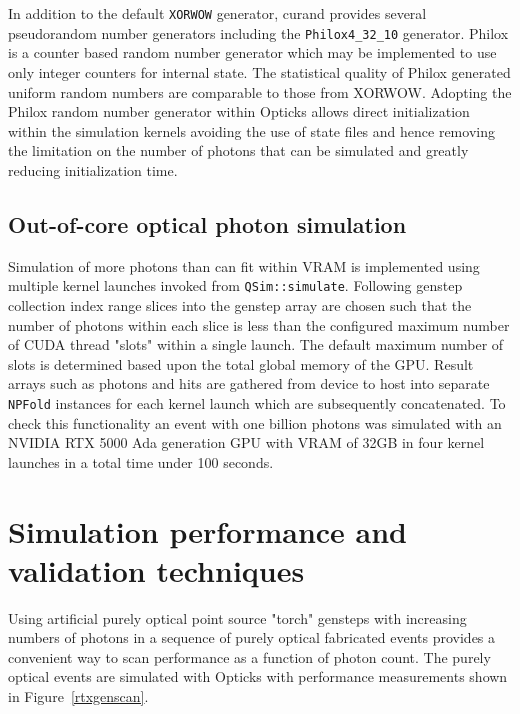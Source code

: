 \documentclass{webofc}
\begin{document}
In addition to the default {\tt XORWOW} generator, curand provides several 
pseudorandom number generators including the {\tt Philox4\_32\_10} generator.
Philox is a counter based random number generator which may be implemented to 
use only integer counters for internal state. 
The statistical quality of Philox generated uniform random numbers are comparable 
to those from XORWOW\cite{curand}.
Adopting the Philox random number generator within Opticks allows direct initialization within
the simulation kernels avoiding the use of state files and hence removing the 
limitation on the number of photons that can be simulated and greatly reducing 
initialization time. 
%
\subsection{Out-of-core optical photon simulation}
%
Simulation of more photons than can fit within VRAM is implemented
using multiple kernel launches invoked from {\tt QSim::simulate}. 
Following genstep collection index range slices into the genstep array 
are chosen such that the number of photons within each slice is less than 
the configured maximum number of CUDA thread "slots" within a single launch.
The default maximum number of slots is determined based upon the total
global memory of the GPU. Result arrays such as photons and hits are gathered
from device to host into separate {\tt NPFold} instances for each kernel launch 
which are subsequently concatenated. To check this functionality 
an event with one billion photons was simulated with an NVIDIA RTX 5000 Ada 
generation GPU with VRAM of 32GB in four kernel launches 
in a total time under 100 seconds. 
%
\section{Simulation performance and validation techniques}
%
Using artificial purely optical point source "torch" gensteps with increasing numbers of photons in a sequence of 
purely optical fabricated events provides a convenient way to scan performance as 
a function of photon count. The purely optical events are simulated with Opticks with
performance measurements shown in Figure~\ref{rtxgenscan}.
\end{document}
